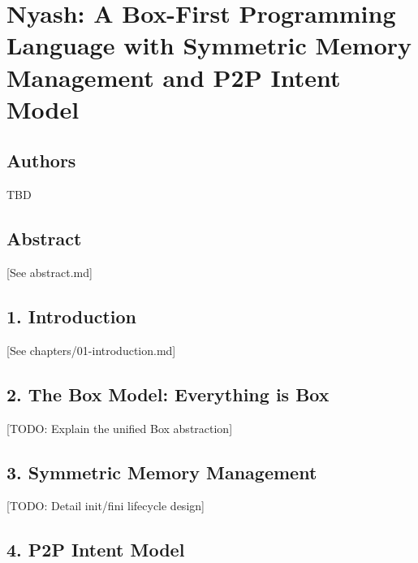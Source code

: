 \documentclass[
]{article}
\author{}
\date{}
\begin{document}
\hypertarget{nyash-a-box-first-programming-language-with-symmetric-memory-management-and-p2p-intent-model}{%
\section{Nyash: A Box-First Programming Language with Symmetric Memory
Management and P2P Intent
Model}\label{nyash-a-box-first-programming-language-with-symmetric-memory-management-and-p2p-intent-model}}

\hypertarget{authors}{%
\subsection{Authors}\label{authors}}

TBD

\hypertarget{abstract}{%
\subsection{Abstract}\label{abstract}}

{[}See abstract.md{]}

\hypertarget{introduction}{%
\subsection{1. Introduction}\label{introduction}}

{[}See chapters/01-introduction.md{]}

\hypertarget{the-box-model-everything-is-box}{%
\subsection{2. The Box Model: Everything is
Box}\label{the-box-model-everything-is-box}}

{[}TODO: Explain the unified Box abstraction{]}

\hypertarget{symmetric-memory-management}{%
\subsection{3. Symmetric Memory
Management}\label{symmetric-memory-management}}

{[}TODO: Detail init/fini lifecycle design{]}

\hypertarget{p2p-intent-model}{%
\subsection{4. P2P Intent Model}\label{p2p-intent-model}}
\end{document}
